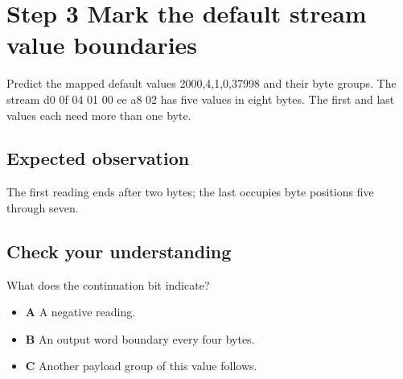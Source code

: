 \section{Step 3 Mark the default stream value boundaries}\label{delta-s03}

Predict the mapped default values 2000,4,1,0,37998 and their byte groups. The stream d0 0f 04 01 00 ee a8 02 has five values in eight bytes. The first and last values each need more than one byte.

\subsection{Expected observation}
The first reading ends after two bytes; the last occupies byte positions five through seven.

\subsection{Check your understanding}
What does the continuation bit indicate?

\begin{itemize}
  \item \textbf{A} A negative reading.
  \item \textbf{B} An output word boundary every four bytes.
  \item \textbf{C} Another payload group of this value follows.
\end{itemize}
